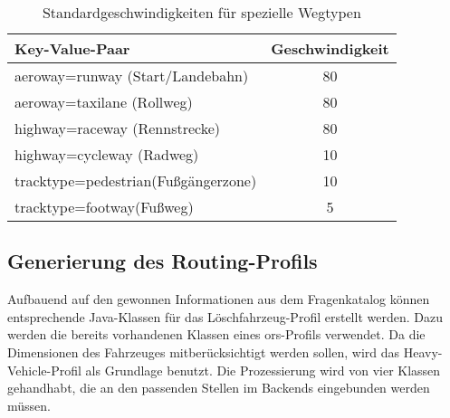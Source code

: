 \begin{table}
\caption{Standardgeschwindigkeiten für spezielle Wegtypen}
\label{tab:speedinfospecial}
\centering
\begin{tabular}{|l|c|}
\hline
\multicolumn{1}{|l|}{Key-Value-Paar} & \multicolumn{1}{c|}{Geschwindigkeit} \\
\hline
aeroway=runway (Start/Landebahn) & 80 \\
aeroway=taxilane (Rollweg) & 80 \\
highway=raceway (Rennstrecke) & 80 \\
highway=cycleway (Radweg) & 10 \\
tracktype=pedestrian(Fußgängerzone) & 10\\
tracktype=footway(Fußweg) & 5\\
\hline
\end{tabular}
\end{table}



\subsection{Generierung des Routing-Profils}
\label{backendGraphBuild}
Aufbauend auf den gewonnen Informationen aus dem Fragenkatalog können entsprechende Java-Klassen für das Löschfahrzeug-Profil erstellt werden.
Dazu werden die bereits vorhandenen Klassen eines \gls{ors}-Profils verwendet.
Da die Dimensionen des Fahrzeuges mitberücksichtigt werden sollen, wird das Heavy-Vehicle-Profil als Grundlage benutzt.
Die Prozessierung wird von vier Klassen gehandhabt, die an den passenden Stellen im Backends eingebunden werden müssen.


